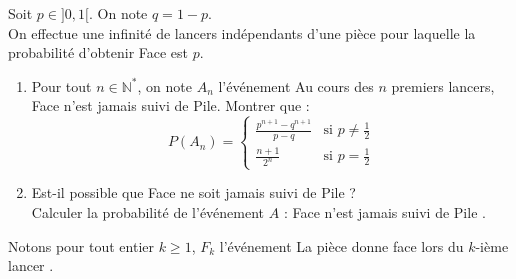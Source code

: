 \documentclass[a4paper,10pt]{report}
\begin{document}
\begin{Exa}
Soit $p \in ]0,1[$. On note $q=1-p$.\\
On effectue une infinité de lancers indépendants d'une pièce pour laquelle la probabilité d'obtenir Face est $p$.
\begin{enumerate}
\item Pour tout $n \in \mathbb{N}^*$, on note $A_n$ l'événement \og Au cours des $n$ premiers lancers, Face n'est jamais suivi de Pile\fg.
Montrer que :
$$P(A_n)=\begin{cases}
{\frac{p^{n+1}-q^{n+1}}{p-q}} & \text{si } p \neq \frac 1 2\\
{\frac{n+1}{2^n}} & \text{si } p=\frac 1 2
\end{cases}$$
\item Est-il possible que Face ne soit jamais suivi de Pile ?\\
Calculer la probabilité de l'événement $A$ : \og Face n'est jamais suivi de Pile \fg.
\end{enumerate}
\end{Exa}

\corr Notons pour tout entier $k \geq 1$, $F_k$ l'événement \og La pièce donne face lors du $k$-ième lancer \fg .
\end{document}
